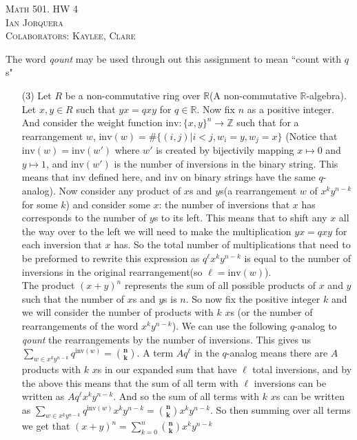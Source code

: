 \documentclass[12pt]{amsart}
\theoremstyle{definition}
\newcommand{\R}{\mathbb{R}}
\newcommand{\Z}{\mathbb{Z}}
\newcommand{\ra}{\rightarrow}
\begin{document}
\begin{center}
    \textsc{Math 501. HW 4\\ Ian Jorquera\\ Colaborators: Kaylee, Clare}
\end{center}
\vspace{1em}


The word \textit{qount} may be used through out this assignment to mean ``count with $q$s"
\begin{itemize}
\item[(3)] %
Let $R$ be a non-commutative ring over $\R$(A non-commutative $\R$-algebra). Let $x,y\in R$ such that $yx=qxy$ for $q\in\R$. Now fix $n$ as a positive integer. And consider the weight function $\text{inv}:\{x,y\}^n\ra \Z$ such that for a rearrangement $w$, $\text{inv}(w)=\#\{(i,j)| i<j, w_i=y, w_j=x\}$ (Notice that $\text{inv}(w)=\text{inv}(w')$ where $w'$ is created by bijectivily mapping $x\mapsto 0$ and $y\mapsto 1$, and $\text{inv}(w')$ is the number of inversions in the binary string. This means that $\text{inv}$ defined here, and $\text{inv}$ on binary strings have the same $q$-analog). 
Now consider any product of $x$s and $y$s(a rearrangement $w$ of $x^ky^{n-k}$ for some $k$) and consider some $x$: the number of inversions that $x$ has corresponds to the number of $y$s to its left. This means that to shift any $x$ all the way over to the left we will need to make the multiplication $yx=qxy$ for each inversion that $x$ has. 
So the total number of multiplications that need to be preformed to rewrite this expression as $q^\ell x^k y^{n-k}$ is equal to the number of inversions in the original rearrangement(so $\ell=\text{inv}(w)$). \\

The product $(x+y)^n$ represents the sum of all possible products of $x$ and $y$ such that the number of $x$s and $y$s is $n$. So now fix the positive integer $k$ and we will consider the number of products with $k$ $x$s (or the number of rearrangements of the word $x^ky^{n-k}$). We can use the following $q$-analog to 
\textit{qount} the rearrangements by the number of inversions. This gives us $\sum_{w\in x^ky^{n-k}}q^{\text{inv}(w)} ={\textbf{n}\choose \textbf{k}}$. 
A term $Aq^\ell$ in the $q$-analog means there are $A$ products with $k$ $x$s in our expanded sum that have $\ell$ total inversions, and by the above this means that the sum of all term with $\ell$ inversions can be written as $Aq^\ell x^ky^{n-k}$. And so the sum of all terms with $k$ $x$s can be written as $\sum_{w\in x^ky^{n-k}}q^{\text{inv}(w)}x^ky^{n-k} ={\textbf{n}\choose \textbf{k}}x^ky^{n-k}$. So then summing over all terms we get that $(x+y)^n=\sum_{k=0}^{n}{\textbf{n}\choose \textbf{k}}x^ky^{n-k}$ \\


\end{itemize}
\end{document}
